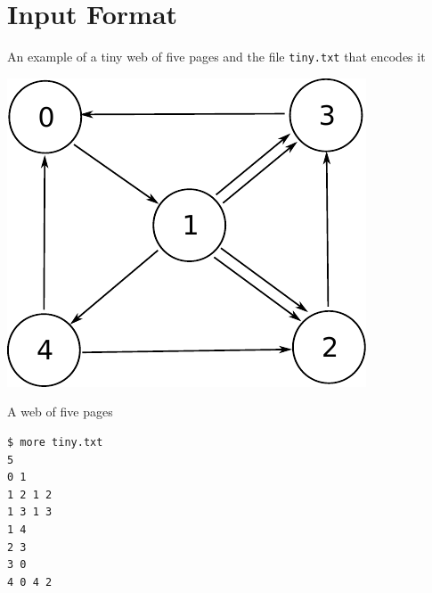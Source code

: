 \documentclass[8pt,a4paper,compress]{beamer}
\begin{document}
\section{Input Format}
\begin{frame}[fragile]
An example of a tiny web of five pages and the file \lstinline{tiny.txt} that encodes it

\begin{center}
\includegraphics[scale=0.6]{figures/tiny_www.pdf}

\smallskip

\tiny A web of five pages
\end{center}

\begin{lstlisting}[language={}]
$ more tiny.txt
5
0 1
1 2 1 2
1 3 1 3
1 4
2 3
3 0
4 0 4 2
\end{lstlisting}
\end{frame}
\end{document}
